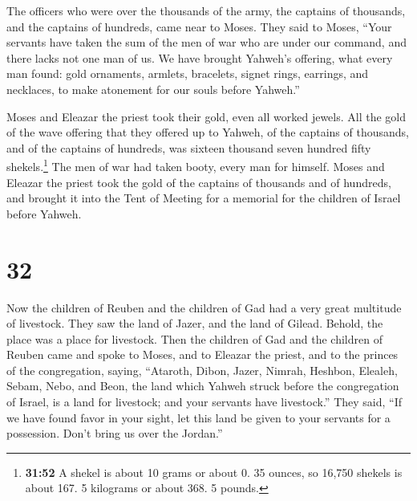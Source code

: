  The officers who were over the thousands of the army,
the captains of thousands, and the captains of hundreds, came near to
Moses.  They said to Moses, ``Your servants have taken
the sum of the men of war who are under our command, and there lacks not
one man of us.  We have brought Yahweh's offering, what
every man found: gold ornaments, armlets, bracelets, signet rings,
earrings, and necklaces, to make atonement for our souls before
Yahweh.''

 Moses and Eleazar the priest took their gold, even all
worked jewels.  All the gold of the wave offering that
they offered up to Yahweh, of the captains of thousands, and of the
captains of hundreds, was sixteen thousand seven hundred fifty
shekels.\footnote{\textbf{31:52} A shekel is about 10 grams or about 0.
  35 ounces, so 16,750 shekels is about 167. 5 kilograms or about 368. 5
  pounds.}  The men of war had taken booty, every man for
himself.  Moses and Eleazar the priest took the gold of
the captains of thousands and of hundreds, and brought it into the Tent
of Meeting for a memorial for the children of Israel before Yahweh.

\hypertarget{section-31}{%
\section{32}\label{section-31}}

 Now the children of Reuben and the children of Gad had a
very great multitude of livestock. They saw the land of Jazer, and the
land of Gilead. Behold, the place was a place for livestock.
 Then the children of Gad and the children of Reuben came
and spoke to Moses, and to Eleazar the priest, and to the princes of the
congregation, saying,  ``Ataroth, Dibon, Jazer, Nimrah,
Heshbon, Elealeh, Sebam, Nebo, and Beon,  the land which
Yahweh struck before the congregation of Israel, is a land for
livestock; and your servants have livestock.''  They said,
``If we have found favor in your sight, let this land be given to your
servants for a possession. Don't bring us over the Jordan.''

